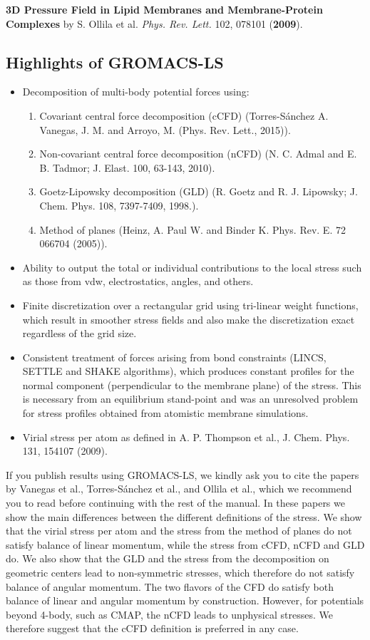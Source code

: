 \documentclass[10pt,letterpaper,notitlepage]{article}
\begin{document}
\textbf{3D Pressure Field in Lipid Membranes and Membrane-Protein Complexes} by S. Ollila et al. \emph{Phys. Rev. Lett.} 102, 078101 (\textbf{2009}). 

\subsection{Highlights of GROMACS-LS}
\begin{itemize}
    \item Decomposition of multi-body potential forces using:
    \begin{enumerate}
	\item Covariant central force decomposition (cCFD) (Torres-S\'anchez A. Vanegas, J. M. and Arroyo, M. (Phys. Rev. Lett., 2015)).
    \item Non-covariant central force decomposition (nCFD) (N. C. Admal and E. B. Tadmor; J. Elast. 100, 63-143, 2010).
    \item Goetz-Lipowsky decomposition (GLD) (R. Goetz and R. J. Lipowsky; J. Chem. Phys. 108, 7397-7409, 1998.). 
    \item Method of planes (Heinz, A.  Paul W. and Binder K. Phys. Rev. E. 72 066704 (2005)).
    \end{enumerate}
	\item Ability to output the total or individual contributions to the local stress such as those from vdw, electrostatics, angles, and others.
	\item Finite discretization over a rectangular grid using tri-linear weight functions, which result in smoother stress fields and also make the discretization exact regardless of the grid size.
	\item Consistent treatment of forces arising from bond constraints (LINCS, SETTLE and SHAKE algorithms), which produces constant profiles for the normal component (perpendicular to the membrane plane) of the stress. This is necessary from an equilibrium stand-point and was an unresolved problem for stress profiles obtained from atomistic membrane simulations.
	\item Virial stress per atom as defined in A. P. Thompson et al., J. Chem. Phys. 131, 154107 (2009). 
\end{itemize}

If you publish results using GROMACS-LS, we kindly ask you to cite the papers by Vanegas et al., Torres-S\'anchez et al., and Ollila et al., which we recommend you to read before continuing with the rest of the manual. In these papers we show the main differences between the different definitions of the stress. We show that the virial stress per atom and the stress from the method of planes do not satisfy balance of linear momentum, while the stress from cCFD, nCFD and GLD do. We also show that the GLD and the stress from the decomposition on geometric centers lead to non-symmetric stresses, which therefore do not satisfy balance of angular momentum. The two flavors of the CFD do satisfy both balance of linear and angular momentum by construction. However, for potentials beyond 4-body, such as CMAP, the nCFD leads to unphysical stresses. We therefore suggest that the cCFD definition is preferred in any case.
\end{document}
